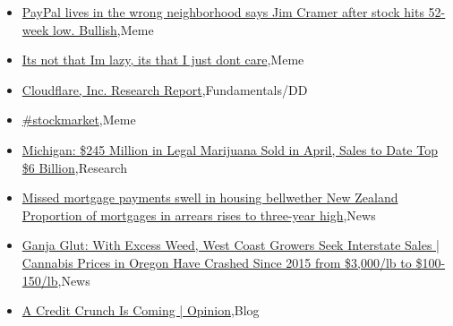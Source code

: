 \documentclass{article}%
\begin{document}
%
\begin{itemize}%
\item%
\href{https://reddit.com/r/wallstreetbets/comments/13gdo14/paypal\_lives\_in\_the\_wrong\_neighborhood\_says\_jim/}{PayPal lives in the wrong neighborhood says Jim Cramer after stock hits 52-week low. Bullish},Meme%
\item%
\href{https://reddit.com/r/wallstreetbets/comments/13g36r9/its\_not\_that\_im\_lazy\_its\_that\_i\_just\_dont\_care/}{Its not that Im lazy, its that I just dont care},Meme%
\item%
\href{https://reddit.com/r/StockMarket/comments/13gc30x/cloudflare\_inc\_research\_report/}{Cloudflare, Inc. Research Report},Fundamentals/DD%
\item%
\href{https://reddit.com/r/StockMarket/comments/13g7hk9/stockmarket/}{\#stockmarket},Meme%
\item%
\href{https://reddit.com/r/Economics/comments/13gb8hm/michigan\_245\_million\_in\_legal\_marijuana\_sold\_in/}{Michigan: \$245 Million in Legal Marijuana Sold in April, Sales to Date Top \$6 Billion},Research%
\item%
\href{https://reddit.com/r/Economics/comments/13fxzlv/missed\_mortgage\_payments\_swell\_in\_housing/}{Missed mortgage payments swell in housing bellwether New Zealand  Proportion of mortgages in arrears rises to three-year high},News%
\item%
\href{https://reddit.com/r/Economics/comments/13fxj1u/ganja\_glut\_with\_excess\_weed\_west\_coast\_growers/}{Ganja Glut: With Excess Weed, West Coast Growers Seek Interstate Sales | Cannabis Prices in Oregon Have Crashed Since 2015 from \$3,000/lb to \$100-150/lb},News%
\item%
\href{https://reddit.com/r/Economics/comments/13fshdi/a\_credit\_crunch\_is\_coming\_opinion/}{A Credit Crunch Is Coming | Opinion},Blog%
\end{itemize}%
\end{document}

